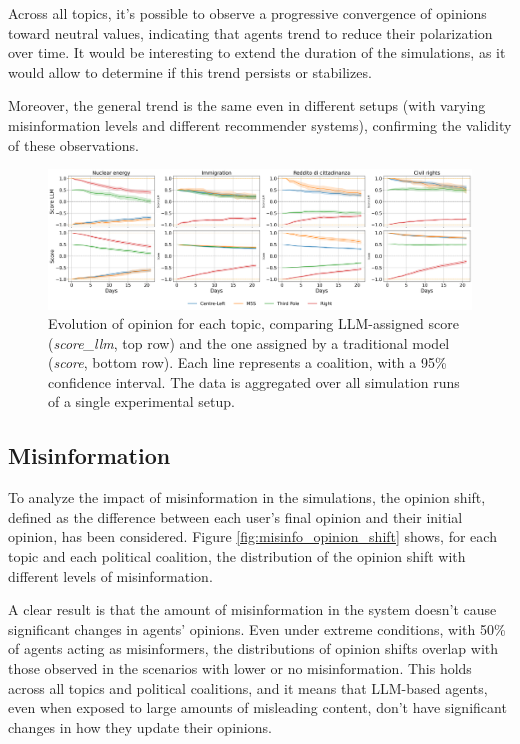 Across all topics, it's possible to observe a progressive convergence of opinions toward neutral values, indicating that agents trend to reduce their polarization over time.
It would be interesting to extend the duration of the simulations, as it would allow to determine if this trend persists or stabilizes.

Moreover, the general trend is the same even in different setups (with varying misinformation levels and different recommender systems), confirming the validity of these observations.

\begin{figure}[h]
    \centering
    \includegraphics[width=1\linewidth]{Images/Opinions/d21a100m00d_DefaultRecSys.png}
    \caption{Evolution of opinion for each topic, comparing LLM-assigned score (\textit{score\_llm}, top row) and the one assigned by a traditional model (\textit{score}, bottom row).
    Each line represents a coalition, with a 95\% confidence interval.
    The data is aggregated over all simulation runs of a single experimental setup.}
    \label{fig:opinion_evolution}
\end{figure}


\subsection{Misinformation}
To analyze the impact of misinformation in the simulations, the opinion shift, defined as the difference between each user's final opinion and their initial opinion, has been considered.
Figure \ref{fig:misinfo_opinion_shift} shows, for each topic and each political coalition, the distribution of the opinion shift with different levels of misinformation.

A clear result is that the amount of misinformation in the system doesn't cause significant changes in agents' opinions.
Even under extreme conditions, with 50\% of agents acting as misinformers, the distributions of opinion shifts overlap with those observed in the scenarios with lower or no misinformation.
This holds across all topics and political coalitions, and it means that LLM-based agents, even when exposed to large amounts of misleading content, don't have significant changes in how they update their opinions.

